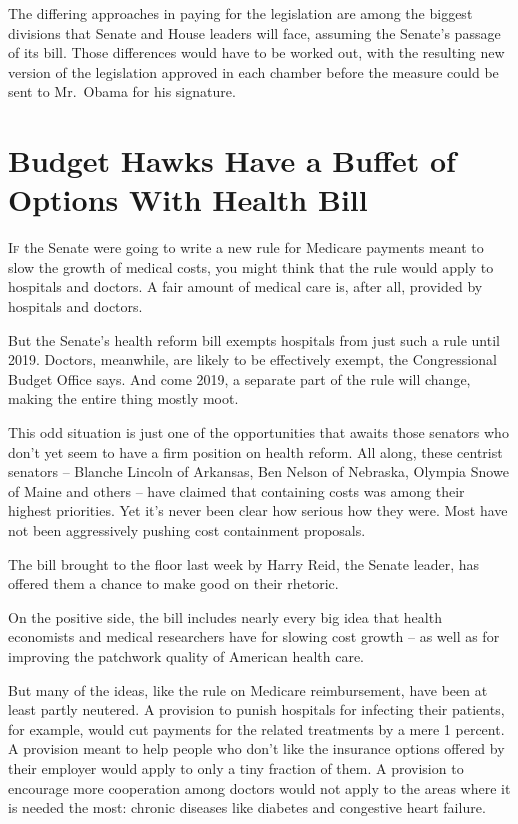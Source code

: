 ﻿\documentclass[12pt]{article}
\begin{document}
The differing approaches in paying for the legislation are among the biggest divisions that Senate
and House leaders will face, assuming the Senate's passage of its bill. Those differences would have
to be worked out, with the resulting new version of the legislation approved in each chamber before
the measure could be sent to Mr.~Obama for his signature.

\section{Budget Hawks Have a Buffet of Options With Health Bill}

\lettrine{I}{f} the Senate were going to write a new rule for Medicare
payments meant to slow the growth of medical costs, you might think that the rule would apply to
hospitals and doctors. A fair amount of medical care is, after all, provided by hospitals and
doctors.

But the Senate's health reform bill exempts hospitals from just such a rule until 2019. Doctors,
meanwhile, are likely to be effectively exempt, the Congressional Budget Office says. And come 2019,
a separate part of the rule will change, making the entire thing mostly moot.

This odd situation is just one of the opportunities that awaits those senators who don't yet seem to
have a firm position on health reform. All along, these centrist senators -- Blanche Lincoln of
Arkansas, Ben Nelson of Nebraska, Olympia Snowe of Maine and others -- have claimed that containing
costs was among their highest priorities. Yet it's never been clear how serious how they were. Most
have not been aggressively pushing cost containment proposals.

The bill brought to the floor last week by Harry Reid, the Senate leader, has offered them a chance
to make good on their rhetoric.

On the positive side, the bill includes nearly every big idea that health economists and medical
researchers have for slowing cost growth -- as well as for improving the patchwork quality of
American health care.

But many of the ideas, like the rule on Medicare reimbursement, have been at least partly neutered.
A provision to punish hospitals for infecting their patients, for example, would cut payments for
the related treatments by a mere 1 percent. A provision meant to help people who don't like the
insurance options offered by their employer would apply to only a tiny fraction of them. A provision
to encourage more cooperation among doctors would not apply to the areas where it is needed the
most: chronic diseases like diabetes and congestive heart failure.
\end{document}
